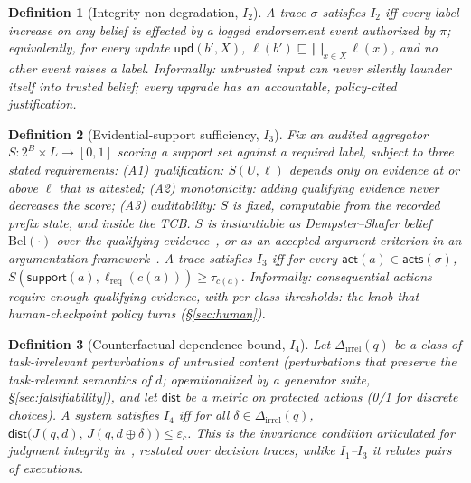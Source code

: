 \documentclass[conference]{IEEEtran}
\newtheorem{definition}{Definition}
\newcommand{\Ione}{\ensuremath{I_1}}
\newcommand{\Itwo}{\ensuremath{I_2}}
\newcommand{\Ithree}{\ensuremath{I_3}}
\newcommand{\Ifour}{\ensuremath{I_4}}
\newcommand{\support}{\ensuremath{\mathsf{support}}}
\newcommand{\acts}{\ensuremath{\mathsf{acts}}}
\newcommand{\ev}[1]{\ensuremath{\mathsf{#1}}}
\newcommand{\lreq}{\ensuremath{\ell_{\mathrm{req}}}}
\newcommand{\Dirrel}{\ensuremath{\Delta_{\mathrm{irrel}}}}
\newcommand{\dist}{\ensuremath{\mathsf{dist}}}
\begin{document}
\begin{definition}[Integrity non-degradation, \Itwo]
A trace $\sigma$ satisfies \Itwo{} iff every label increase on any
belief is effected by a logged endorsement event authorized by
$\pi$; equivalently, for every update $\ev{upd}(b', X)$,
$\ell(b') \sqsubseteq \bigsqcap_{x \in X} \ell(x)$, and no other
event raises a label. Informally: untrusted input can never
silently launder itself into trusted belief; every upgrade has an
accountable, policy-cited justification.
\end{definition}

\begin{definition}[Evidential-support sufficiency, \Ithree]
\label{def:i3}
Fix an audited aggregator $S : 2^{B} \times L \to [0,1]$ scoring a
support set against a required label, subject to three stated
requirements: \emph{(A1) qualification}: $S(U, \ell)$ depends only
on evidence at or above $\ell$ that is attested;
\emph{(A2) monotonicity}: adding qualifying evidence never
decreases the score; \emph{(A3) auditability}: $S$ is fixed,
computable from the recorded prefix state, and inside the TCB.
$S$ is instantiable as Dempster--Shafer belief $\mathrm{Bel}(\cdot)$
over the qualifying evidence~\cite{shafer}, or as an
accepted-argument criterion in an argumentation
framework~\cite{dung}. A trace satisfies \Ithree{} iff for every
$\ev{act}(a) \in \acts(\sigma)$,
$S(\support(a), \lreq(c(a))) \geq \tau_{c(a)}$. Informally:
consequential actions require enough qualifying evidence, with
per-class thresholds: the knob that human-checkpoint policy turns
(\S\ref{sec:human}).
\end{definition}

\begin{definition}[Counterfactual-dependence bound, \Ifour]
Let $\Dirrel(q)$ be a class of task-irrelevant perturbations of
untrusted content (perturbations that preserve the task-relevant
semantics of $d$; operationalized by a generator suite,
\S\ref{sec:falsifiability}), and let $\dist$ be a metric on
protected actions (0/1 for discrete choices). A system satisfies
\Ifour{} iff for all $\delta \in \Dirrel(q)$,
$\dist\big(J(q, d),\, J(q, d \oplus \delta)\big) \leq \varepsilon_c$.
This is the invariance condition articulated for judgment
integrity in~\cite{qu}, restated over decision traces; unlike
\Ione--\Ithree{} it relates \emph{pairs} of executions.
\end{definition}
\end{document}
